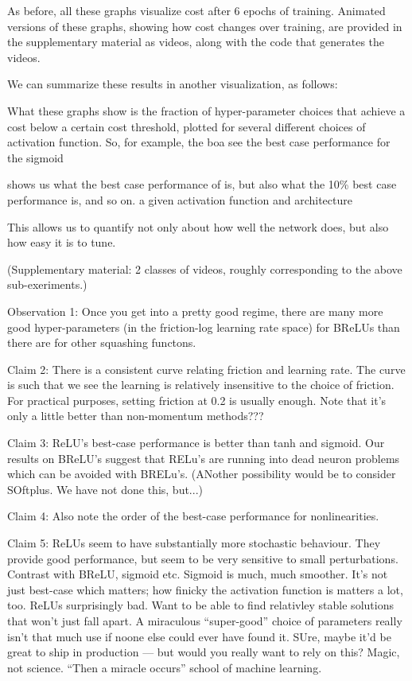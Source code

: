 \documentclass[10pt]{article}
\begin{document}
As before, all these graphs visualize cost after 6 epochs of
training. Animated versions of these graphs, showing how cost changes
over training, are provided in the supplementary material as videos,
along with the code that generates the videos.

We can summarize these results in another visualization, as follows:
%

%
What these graphs show is the fraction of hyper-parameter choices that
achieve a cost below a certain cost threshold, plotted for several
different choices of activation function.  So, for example, the boa
see the best case performance for the sigmoid

shows us what the
best case performance of 
is, but also what the 10\% best case performance is, and so on. 
a given activation function and architecture


This
allows us to quantify not only about how well the network does, but
also how easy it is to tune.




(Supplementary material: 2 classes of videos, roughly corresponding to
the above sub-exeriments.)


Observation 1: Once you get into a pretty good regime, there are many more
good hyper-parameters (in the friction-log learning rate space) for
BReLUs than there are for other squashing functons.  

Claim 2: There is a consistent curve relating friction and learning
rate.  The curve is such that we see the learning is relatively
insensitive to the choice of friction.  For practical purposes,
setting friction at 0.2 is usually enough.  Note that it's only a
little better than non-momentum methods???

Claim 3: ReLU's best-case performance is better than tanh and sigmoid.
Our results on BReLU's suggest that RELu's are running into dead
neuron problems which can be avoided with BRELu's.  (ANother
possibility would be to consider SOftplus.  We have not done this,
but...)

Claim 4: Also note the order of the best-case performance for
nonlinearities.

Claim 5: ReLUs seem to have substantially more stochastic behaviour.
They provide good performance, but seem to be very sensitive to small
perturbations. Contrast with BReLU, sigmoid etc.  Sigmoid is much,
much smoother.  It's not just best-case which matters; how finicky the
activation function is matters a lot, too.  ReLUs surprisingly bad.
Want to be able to find relativley stable solutions that won't just
fall apart.  A miraculous ``super-good'' choice of parameters really
isn't that much use if noone else could ever have found it. SUre,
maybe it'd be great to ship in production --- but would you really
want to rely on this?  Magic, not science.  ``Then a miracle occurs''
school of machine learning.
\end{document}
